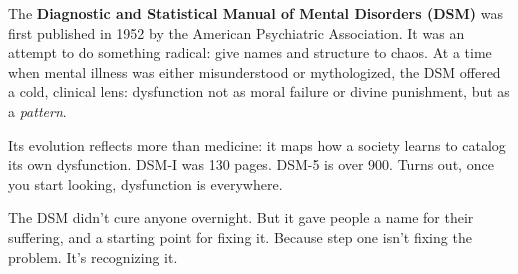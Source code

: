 \begin{tcolorbox}[
    title=Sidebar: The DSM — A Taxonomy of Dysfunction,
    colback=gray!5,
    colframe=black,
    fonttitle=\bfseries,
    sharp corners=south,
    boxrule=0.5pt,
    enhanced,
    breakable
  ]
  The \textbf{Diagnostic and Statistical Manual of Mental Disorders (DSM)} was first published in 1952 by the American Psychiatric Association. It was an attempt to do something radical: give names and structure to chaos. At a time when mental illness was either misunderstood or mythologized, the DSM offered a cold, clinical lens: dysfunction not as moral failure or divine punishment, but as a \textit{pattern}.
  
  Its evolution reflects more than medicine: it maps how a society learns to catalog its own dysfunction. DSM-I was 130 pages. DSM-5 is over 900. Turns out, once you start looking, dysfunction is everywhere.
  
  The DSM didn’t cure anyone overnight. But it gave people a name for their suffering, and a starting point for fixing it. Because step one isn’t fixing the problem. It’s recognizing it.
\end{tcolorbox}


